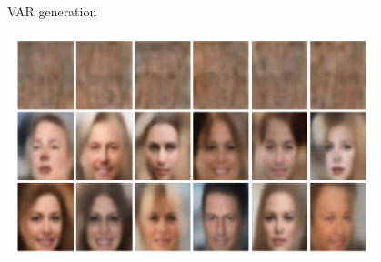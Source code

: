 \documentclass[11pt]{beamer}
\begin{document}
\begin{frame}{VAR generation \cite{pml1Book,pml2Book}}
\begin{center}
\includegraphics[width=0.8\textwidth]{Pic/var_generation.png}
\end{center}
\end{frame}
\end{document}
